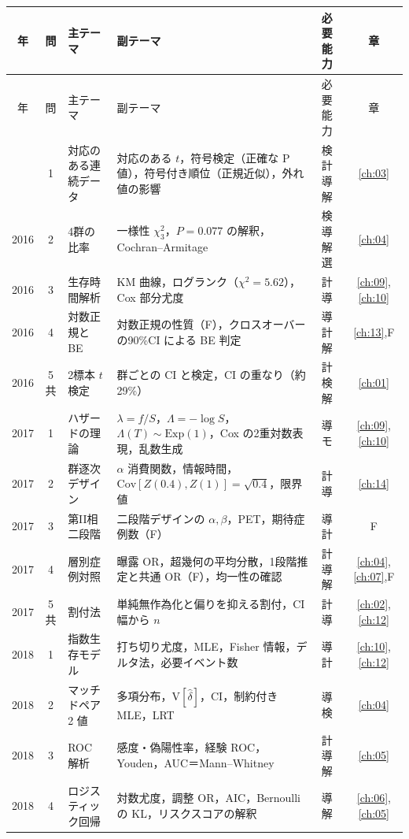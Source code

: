 \documentclass[a4paper,11pt,openany]{ltjsbook}
\newcommand{\V}{\mathrm{V}}
\newcommand{\Cov}{\mathrm{Cov}}
\newcommand{\Ex}{\mathrm{Exp}}
\begin{document}
\begin{center}\scriptsize
\setlength{\tabcolsep}{3pt}
\begin{longtable}{@{}ccL{36mm}L{58mm}L{16mm}c@{}}
\toprule
年 & 問 & 主テーマ & 副テーマ & 必要能力 & 章\\
\midrule
\endfirsthead
\toprule
年 & 問 & 主テーマ & 副テーマ & 必要能力 & 章\\
\midrule
\endhead
\bottomrule
{} & 1 & 対応のある連続データ & 対応のある $t$，符号検定（正確な P 値），符号付き順位（正規近似），外れ値の影響 & 検 計 導 解 & \ref{ch:03}\\
2016 & 2 & 4群の比率 & 一様性 $\chi^2_3$，$P=0.077$ の解釈，Cochran--Armitage & 検 導 解 選 & \ref{ch:04}\\
2016 & 3 & 生存時間解析 & KM 曲線，ログランク（$\chi^2=5.62$），Cox 部分尤度 & 計 導 & \ref{ch:09},\ref{ch:10}\\
2016 & 4 & 対数正規と BE & 対数正規の性質（F），クロスオーバーの90\%CI による BE 判定 & 導 計 解 & \ref{ch:13},F\\
2016 & 5共 & 2標本 $t$ 検定 & 群ごとの CI と検定，CI の重なり（約29\%） & 計 検 解 & \ref{ch:01}\\
2017 & 1 & ハザードの理論 & $\lambda=f/S$，$\Lambda=-\log S$，$\Lambda(T)\sim\Ex(1)$，Cox の2重対数表現，乱数生成 & 導 モ & \ref{ch:09},\ref{ch:10}\\
2017 & 2 & 群逐次デザイン & $\alpha$ 消費関数，情報時間，$\Cov[Z(0.4),Z(1)]=\sqrt{0.4}$，限界値 & 計 導 & \ref{ch:14}\\
2017 & 3 & 第II相二段階 & 二段階デザインの $\alpha,\beta$，PET，期待症例数（F） & 導 計 & F\\
2017 & 4 & 層別症例対照 & 曝露 OR，超幾何の平均分散，1段階推定と共通 OR（F），均一性の確認 & 計 導 解 & \ref{ch:04},\ref{ch:07},F\\
2017 & 5共 & 割付法 & 単純無作為化と偏りを抑える割付，CI 幅から $n$ & 計 導 & \ref{ch:02},\ref{ch:12}\\
2018 & 1 & 指数生存モデル & 打ち切り尤度，MLE，Fisher 情報，デルタ法，必要イベント数 & 導 計 & \ref{ch:10},\ref{ch:12}\\
2018 & 2 & マッチドペア2 値 & 多項分布，$\V[\hat\delta]$，CI，制約付き MLE，LRT & 導 検 & \ref{ch:04}\\
2018 & 3 & ROC 解析 & 感度・偽陽性率，経験 ROC，Youden，AUC＝Mann--Whitney & 計 導 解 & \ref{ch:05}\\
2018 & 4 & ロジスティック回帰 & 対数尤度，調整 OR，AIC，Bernoulli の KL，リスクスコアの解釈 & 導 解 & \ref{ch:06},\ref{ch:05}\\

\end{longtable}
\end{center}
\end{document}
